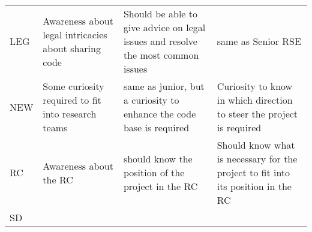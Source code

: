 \documentclass[a4paper
]{article}
\begin{document}
\begin{landscape}
\begin{longtable}[]{@{}llll@{}}
\begin{minipage}[t]{0.19\columnwidth}\raggedright
LEG\strut
\end{minipage} & \begin{minipage}[t]{0.28\columnwidth}\raggedright
Awareness about legal intricacies about sharing code\strut
\end{minipage} & \begin{minipage}[t]{0.28\columnwidth}\raggedright
Should be able to give advice on legal issues and resolve the most
common issues\strut
\end{minipage} & \begin{minipage}[t]{0.14\columnwidth}\raggedright
same as Senior RSE\strut
\end{minipage}\tabularnewline
\begin{minipage}[t]{0.19\columnwidth}\raggedright
NEW\strut
\end{minipage} & \begin{minipage}[t]{0.28\columnwidth}\raggedright
Some curiosity required to fit into research teams\strut
\end{minipage} & \begin{minipage}[t]{0.28\columnwidth}\raggedright
same as junior, but a curiosity to enhance the code base is
required\strut
\end{minipage} & \begin{minipage}[t]{0.14\columnwidth}\raggedright
Curiosity to know in which direction to steer the project is
required\strut
\end{minipage}\tabularnewline
\begin{minipage}[t]{0.19\columnwidth}\raggedright
RC\strut
\end{minipage} & \begin{minipage}[t]{0.28\columnwidth}\raggedright
Awareness about the RC\strut
\end{minipage} & \begin{minipage}[t]{0.28\columnwidth}\raggedright
should know the position of the project in the RC\strut
\end{minipage} & \begin{minipage}[t]{0.14\columnwidth}\raggedright
Should know what is necessary for the project to fit into its position
in the RC\strut
\end{minipage}\tabularnewline
\begin{minipage}[t]{0.19\columnwidth}\raggedright
SD\strut
\end{minipage} & \begin{minipage}[t]{0.28\columnwidth}\raggedright

\end{minipage}
\end{longtable}
\end{landscape}
\end{document}
